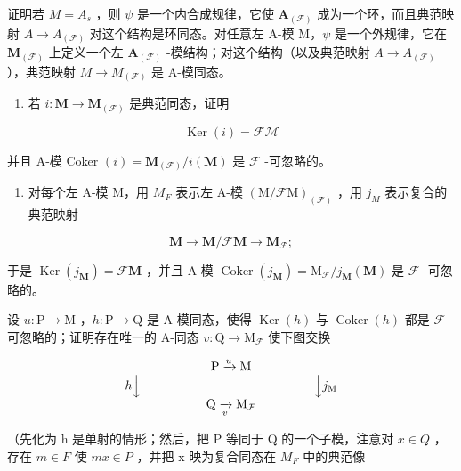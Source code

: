 证明若 \(M = A_{s}\) ，则 \(\psi\) 是一个内合成规律，它使 \(\mathbf{A}_{(\mathcal{F})}\) 成为一个环，而且典范映射 \(A \to A_{(\mathcal{F})}\) 对这个结构是环同态。对任意左 A-模 M，\(\psi\) 是一个外规律，它在 \(\mathbf{M}_{(\mathcal{F})}\) 上定义一个左 \(\mathbf{A}_{(\mathcal{F})}\) -模结构；对这个结构（以及典范映射 \(A \to A_{(\mathcal{F})}\) ），典范映射 \(M \to M_{(\mathcal{F})}\) 是 A-模同态。

\begin{enumerate}
\def\labelenumi{(\alph{enumi})}
\setcounter{enumi}{1}
\tightlist
\item
  若 \(i: \mathbf{M} \to \mathbf{M}_{(\mathcal{F})}\) 是典范同态，证明
\end{enumerate}

\[
\operatorname{Ker} (i) = \mathcal {F M}
\]

并且 A-模 Coker \((i) = \mathbf{M}_{(\mathcal{F})} / i(\mathbf{M})\) 是 \(\mathcal{F}\) -可忽略的。

\begin{enumerate}
\def\labelenumi{(\alph{enumi})}
\setcounter{enumi}{2}
\tightlist
\item
  对每个左 A-模 M，用 \(M_{F}\) 表示左 A-模 \((\mathrm{M}/\mathcal{F}\mathrm{M})_{(\mathcal{F})}\) ，用 \(j_{M}\) 表示复合的典范映射
\end{enumerate}

\[
\mathbf {M} \rightarrow \mathbf {M} / \mathcal {F} \mathbf {M} \rightarrow \mathbf {M} _ {\mathcal {F}};
\]

于是 \(\operatorname{Ker}(j_{\mathbf{M}}) = \mathcal{F}\mathbf{M}\) ，并且 A-模 \(\operatorname{Coker}(j_{\mathbf{M}}) = \mathrm{M}_{\mathcal{F}} / j_{\mathbf{M}}(\mathbf{M})\) 是 \(\mathcal{F}\) -可忽略的。

设 \(u: \mathrm{P} \to \mathrm{M}\) ，\(h: \mathrm{P} \to \mathrm{Q}\) 是 A-模同态，使得 \(\operatorname{Ker}(h)\) 与 \(\operatorname{Coker}(h)\) 都是 \(\mathcal{F}\) -可忽略的；证明存在唯一的 A-同态 \(v: \mathrm{Q} \to \mathrm{M}_{\mathcal{F}}\) 使下图交换

\[
\begin{array}{c} \mathrm{P} \xrightarrow {u} \mathrm{M} \\ h \Big \downarrow \qquad \qquad \qquad \qquad \qquad \qquad \qquad \Big \downarrow j _ {\mathrm{M}} \\ \mathrm{Q} \xrightarrow [ v ]{} \mathrm{M} _ {\mathcal {F}} \end{array}
\]

（先化为 h 是单射的情形；然后，把 P 等同于 Q 的一个子模，注意对 \(x \in Q\) ，存在 \(m \in F\) 使 \(mx \in P\) ，并把 x 映为复合同态在 \(M_{F}\) 中的典范像

